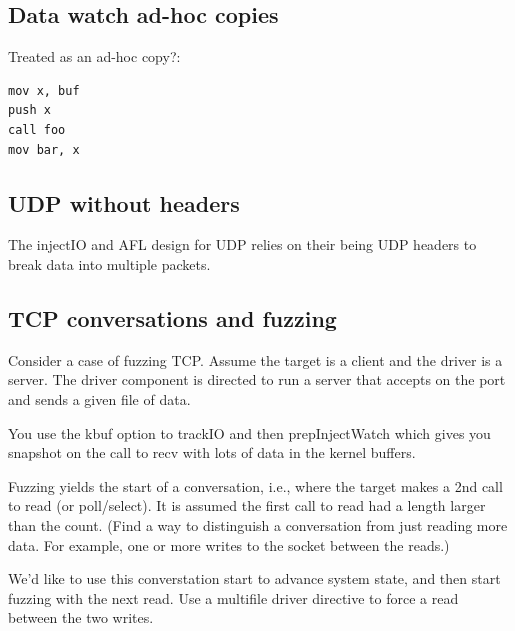 \documentclass[titlepage]{article}
\begin{document}
\begin{appendices}
\subsection{Data watch ad-hoc copies}
Treated as an ad-hoc copy?:
\begin{verbatim}
mov x, buf
push x
call foo
mov bar, x
\end{verbatim}

\subsection{UDP without headers}
The injectIO and AFL design for UDP relies on their being UDP headers to break data into multiple packets.

\subsection{TCP conversations and fuzzing}
Consider a case of fuzzing TCP.  Assume the target is a client and the driver is a server.
The driver component is directed to run a server that accepts on the port and sends a given file of data.

You use the kbuf option to trackIO and then prepInjectWatch which gives you snapshot on the
call to recv with lots of data in the kernel buffers.

Fuzzing yields the start of a conversation, i.e., where the target makes a 2nd call to read (or poll/select).  It
is assumed the first call to read had a length larger than the count.  (Find a way to distinguish a conversation from
just reading more data.  For example, one or more writes to the socket between the reads.)

We'd like to use this converstation start to advance system state, and then start fuzzing with the next read.  Use a 
multifile driver directive to force a read between the two writes.


\end{appendices}
\end{document}
